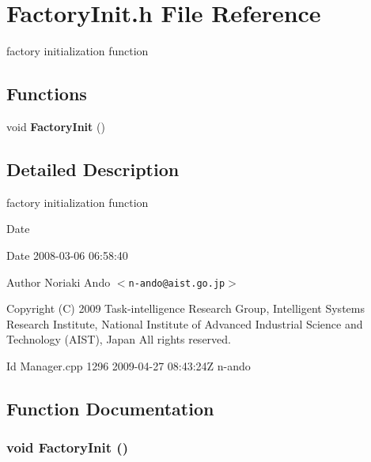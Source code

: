 \section{FactoryInit.h File Reference}
\label{FactoryInit_8h}


factory initialization function  


\subsection*{Functions}
\begin{DoxyCompactItemize}
\item 
void {\bf FactoryInit} ()
\end{DoxyCompactItemize}


\subsection{Detailed Description}
factory initialization function \begin{DoxyDate}{Date}

\end{DoxyDate}
\begin{DoxyParagraph}{Date}
2008-\/03-\/06 06:58:40 
\end{DoxyParagraph}
\begin{DoxyAuthor}{Author}
Noriaki Ando $<${\tt n-\/ando@aist.go.jp}$>$
\end{DoxyAuthor}
Copyright (C) 2009 Task-\/intelligence Research Group, Intelligent Systems Research Institute, National Institute of Advanced Industrial Science and Technology (AIST), Japan All rights reserved.

\begin{DoxyParagraph}{Id}
Manager.cpp 1296 2009-\/04-\/27 08:43:24Z n-\/ando 
\end{DoxyParagraph}


\subsection{Function Documentation}
\subsubsection[{FactoryInit}]{\setlength{\rightskip}{0pt plus 5cm}void FactoryInit ()}\label{FactoryInit_8h_a0ca549944a211f60c882d30e06798e5c}
